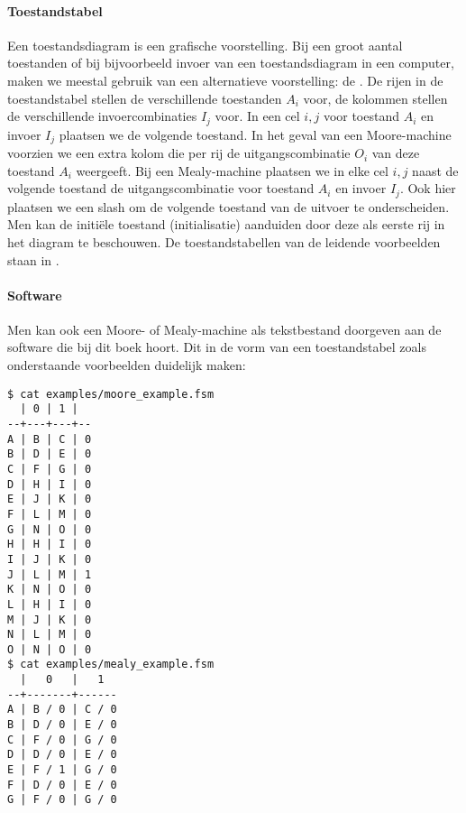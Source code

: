 \paragraph{Toestandstabel}
Een toestandsdiagram is een grafische voorstelling. Bij een groot aantal toestanden of bij bijvoorbeeld invoer van een toestandsdiagram in een computer, maken we meestal gebruik van een alternatieve voorstelling: de . De rijen in de toestandstabel stellen de verschillende toestanden $A_i$ voor, de kolommen stellen de verschillende invoercombinaties $I_j$ voor. In een cel $i,j$ voor toestand $A_i$ en invoer $I_j$ plaatsen we de volgende toestand. In het geval van een Moore-machine voorzien we een extra kolom die per rij de uitgangscombinatie $O_i$ van deze toestand $A_i$ weergeeft. Bij een Mealy-machine plaatsen we in elke cel $i,j$ naast de volgende toestand de uitgangscombinatie voor toestand $A_i$ en invoer $I_j$. Ook hier plaatsen we een slash om de volgende toestand van de uitvoer te onderscheiden. Men kan de initi\"ele toestand (initialisatie) aanduiden door deze als eerste rij in het diagram te beschouwen. De toestandstabellen van de leidende voorbeelden staan in .

\paragraph{Software}
Men kan ook een Moore- of Mealy-machine als tekstbestand doorgeven aan de software die bij dit boek hoort. Dit in de vorm van een toestandstabel zoals onderstaande voorbeelden duidelijk maken:

\begin{verbatim}
$ cat examples/moore_example.fsm
  | 0 | 1 |
--+---+---+--
A | B | C | 0
B | D | E | 0
C | F | G | 0
D | H | I | 0
E | J | K | 0
F | L | M | 0
G | N | O | 0
H | H | I | 0
I | J | K | 0
J | L | M | 1
K | N | O | 0
L | H | I | 0
M | J | K | 0
N | L | M | 0
O | N | O | 0
$ cat examples/mealy_example.fsm
  |   0   |   1
--+-------+------
A | B / 0 | C / 0
B | D / 0 | E / 0
C | F / 0 | G / 0
D | D / 0 | E / 0
E | F / 1 | G / 0
F | D / 0 | E / 0
G | F / 0 | G / 0
\end{verbatim}

